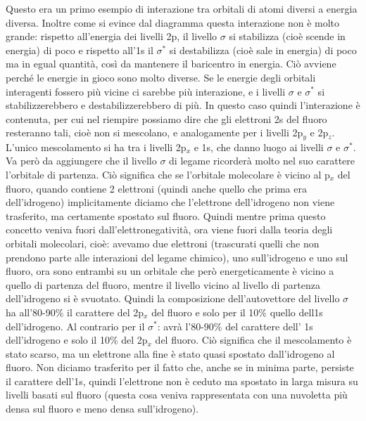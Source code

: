 Questo era un primo esempio di interazione tra orbitali di atomi diversi a energia diversa. Inoltre come si evince dal diagramma questa interazione non è molto grande: rispetto all'energia dei livelli 2p, il livello $\sigma$ si stabilizza (cioè scende in energia) di poco e rispetto all'1s il $\sigma^*$ si destabilizza (cioè sale in energia) di poco ma in egual quantità, così da mantenere il baricentro in energia. Ciò avviene perché le energie in gioco sono molto diverse. Se le energie degli orbitali interagenti fossero più vicine ci sarebbe più interazione, e i livelli $\sigma$ e $\sigma^*$ si stabilizzerebbero e destabilizzerebbero di più. In questo caso quindi l'interazione è contenuta, per cui nel riempire possiamo dire che gli elettroni 2s del fluoro resteranno tali, cioè non si mescolano, e analogamente per i livelli 2p$_y$ e 2p$_z$. L'unico mescolamento si ha tra i livelli 2p$_x$ e 1s, che danno luogo ai livelli $\sigma$ e $\sigma^*$. Va però da aggiungere che il livello $\sigma$ di legame ricorderà molto nel suo carattere l'orbitale di partenza. Ciò significa che se l'orbitale molecolare è vicino al p$_x$ del fluoro, quando contiene 2 elettroni (quindi anche quello che prima era dell'idrogeno) implicitamente diciamo che l'elettrone dell'idrogeno non viene trasferito, ma certamente spostato sul fluoro. Quindi mentre prima questo concetto veniva fuori dall'elettronegatività, ora viene fuori dalla teoria degli orbitali molecolari, cioè: avevamo due elettroni (trascurati quelli che non prendono parte alle interazioni del legame chimico), uno sull'idrogeno e uno sul fluoro, ora sono entrambi su un orbitale che però energeticamente è vicino a quello di partenza del fluoro, mentre il livello vicino al livello di partenza dell'idrogeno si è svuotato. Quindi la composizione dell'autovettore del livello $\sigma$ ha all'80-90\% il carattere del 2p$_x$ del fluoro e solo per il 10\% quello dell1s dell'idrogeno. Al contrario per il $\sigma^*$: avrà l'80-90\% del carattere dell' 1s dell'idrogeno e solo il 10\% del 2p$_x$ del fluoro. Ciò significa che il mescolamento è stato scarso, ma un elettrone alla fine è stato quasi spostato dall'idrogeno al fluoro. Non diciamo trasferito per il fatto che, anche se in minima parte, persiste il carattere dell'1s, quindi l'elettrone non è ceduto ma spostato in larga misura su livelli basati sul fluoro (questa cosa veniva rappresentata con una nuvoletta più densa sul fluoro e meno densa sull'idrogeno).

